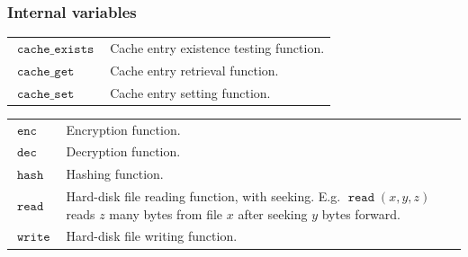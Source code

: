 \documentclass[twocolumn]{article}
\DeclareMathOperator{\cexists}{\mathtt{cache\_exists}}
\DeclareMathOperator{\cget}{\mathtt{cache\_get}}
\DeclareMathOperator{\cset}{\mathtt{cache\_set}}
\DeclareMathOperator{\fread}{\mathtt{read}}
\DeclareMathOperator{\fwrite}{\mathtt{write}}
\DeclareMathOperator{\enc}{\mathtt{enc}}
\DeclareMathOperator{\dec}{\mathtt{dec}}
\DeclareMathOperator{\hash}{\mathtt{hash}}
\begin{document}
\subsubsection{Internal variables}
\begin{tabularx}{\columnwidth}{lX}
    $\cexists$  & Cache entry existence testing function.\\
    $\cget$     & Cache entry retrieval function.\\
    $\cset$     & Cache entry setting function.\\
\end{tabularx}
\begin{tabularx}{\columnwidth}{lX}
    $\enc$      & Encryption function.\\
    $\dec$      & Decryption function.\\
    $\hash$     & Hashing function.\\
    $\fread$    & Hard-disk file reading function, with seeking.  E.g.
                    $\fread(x, y, z)$ reads $z$ many bytes from file $x$
                    after seeking $y$ bytes forward.\\
    $\fwrite$   & Hard-disk file writing function.\\
\end{tabularx}
\end{document}
